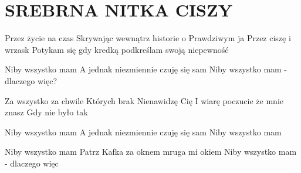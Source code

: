 \documentclass[../../../songbook.tex]{subfiles}
\begin{document}
\TabPositions{8cm} %
\section*{SREBRNA NITKA CISZY}
{}
\vspace{0.5cm}
Przez życie na czas				 \newline
Skrywając wewnątrz historie o  \newline
Prawdziwym ja  \newline
Przez ciszę i wrzask \newline
Potykam się gdy kredką podkreślam swoją niepewność \newline

\-\hspace{1cm} Niby wszystko mam					 \newline
\-\hspace{1cm} A jednak niezmiennie czuję się sam	 \newline	
\-\hspace{1cm} Niby wszystko mam - dlaczego więc?	 \newline

Za wszystko za chwile \newline
Których brak \newline
Nienawidzę Cię \newline
I wiarę poczucie że mnie znasz \newline
Gdy nie było tak \newline

\-\hspace{1cm} Niby wszystko mam					 \newline
\-\hspace{1cm} A jednak niezmiennie czuję się sam	 \newline
\-\hspace{1cm} Niby wszystko mam					 \newline

\-\hspace{1cm} Niby wszystko mam \newline
\-\hspace{1cm} Patrz Kafka za oknem mruga mi okiem \newline
\-\hspace{1cm} Niby wszystko mam - dlaczego więc \newline
\end{document}
